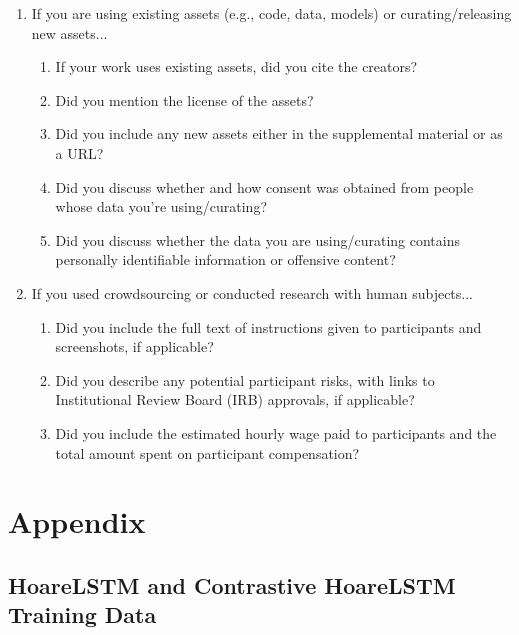\documentclass{article}
\begin{document}
\begin{enumerate}
\item If you are using existing assets (e.g., code, data, models) or curating/releasing new assets...
\begin{enumerate}
  \item If your work uses existing assets, did you cite the creators?
    \answerNA{} %
  \item Did you mention the license of the assets?
  \item Did you include any new assets either in the supplemental material or as a URL?
    \answerNA{} %
  \item Did you discuss whether and how consent was obtained from people whose data you're using/curating?
  \item Did you discuss whether the data you are using/curating contains personally identifiable information or offensive content?
\end{enumerate}

\item If you used crowdsourcing or conducted research with human subjects...
\begin{enumerate}
  \item Did you include the full text of instructions given to participants and screenshots, if applicable?
    \answerNA{} %
  \item Did you describe any potential participant risks, with links to Institutional Review Board (IRB) approvals, if applicable?
    \answerNA{} %
  \item Did you include the estimated hourly wage paid to participants and the total amount spent on participant compensation?
    \answerNA{} %
\end{enumerate}

\end{enumerate}

\clearpage

\appendix

\section{Appendix}


\subsection{HoareLSTM and Contrastive HoareLSTM Training Data}
\end{document}
